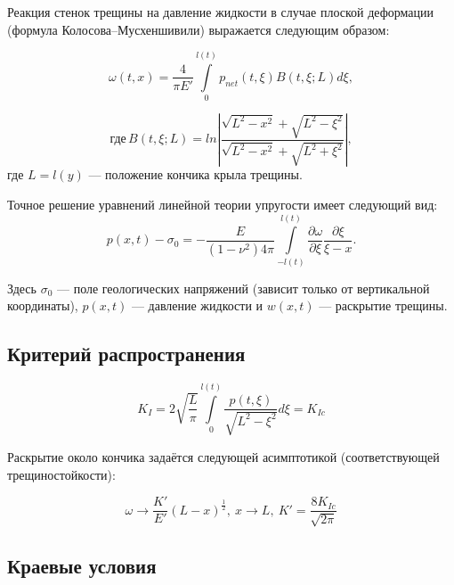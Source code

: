 \documentclass[11pt,a4paper,russian,dvipsnames ]{article}
\begin{document}
Реакция стенок трещины на давление жидкости в случае плоской деформации (формула Колосова--Мусхеншивили) выражается следующим образом: 

\begin{equation}
	\omega(t,x)=\frac{4}{\pi E'}\int \limits_{0}^{l(t)}p_{net}(t,\xi)B(t,\xi;L)d\xi,
\end{equation}	

\begin{equation}
	 \text{где} \,	B(t,\xi;L)=ln\left|\frac{\sqrt{L^{2}-x^{2}}+\sqrt{L^{2}-\xi^{2}}}{\sqrt{L^{2}-x^{2}}+\sqrt{L^{2}+\xi^{2}}}\right|,
\end{equation}
где $L=l(y)$ --- положение кончика крыла трещины.

Точное решение уравнений линейной теории упругости имеет следующий вид:
\begin{equation}
	p(x,t)-\sigma_{0}=-\frac{E}{(1-\nu^2)4\pi}\int \limits_{-l(t)}^{l(t)}\frac{\partial \omega}{\partial \xi}\frac{\partial \xi}{\xi-x}.
\end{equation}

Здесь $\sigma_{0}$ --- поле геологических напряжений (зависит только от вертикальной координаты), $p(x,t)$ --- давление жидкости и $w(x,t)$ --- раскрытие трещины.

\subsection{Критерий распространения} 

\begin{equation}
	K_I=2\sqrt{\frac{L}{\pi}}\int \limits_{0}^{l(t)}\frac{p(t,\xi)}{\sqrt{L^{2}-\xi^{2}}} d\xi=K_{Ic}
\end{equation}

Раскрытие около кончика задаётся следующей асимптотикой (соответствующей трещиностойкости):

\begin{equation}
	\omega\rightarrow\frac{K'}{E'}(L-x)^{\frac{1}{2}},\ x\rightarrow L,\ K'=\frac{8 K_{Ic}}{\sqrt{2\pi}}
\end{equation}

\subsection{Краевые условия}
\end{document}
